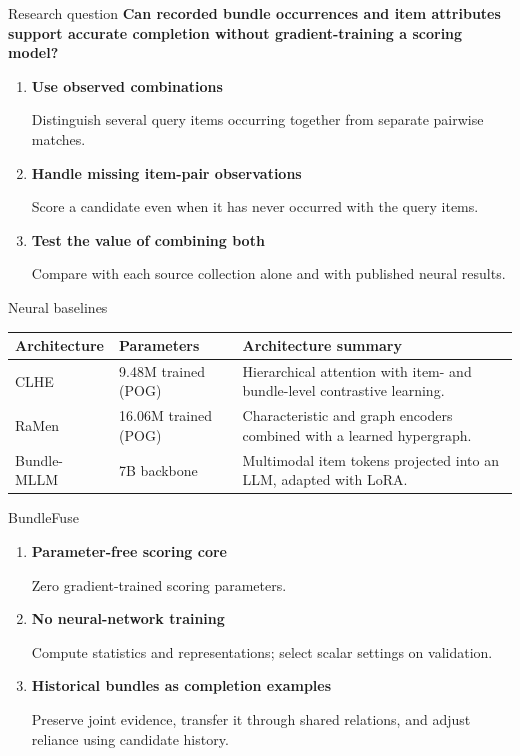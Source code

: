 \documentclass[11pt,aspectratio=169]{beamer}
\newcommand{\key}[1]{\textcolor{Accent}{\textbf{#1}}}
\begin{document}
\begin{frame}{Research question}
\key{Can recorded bundle occurrences and item attributes support accurate
completion without gradient-training a scoring model?}
\vspace{6mm}
\begin{enumerate}\setlength\itemsep{8pt}
\item \textbf{Use observed combinations}\par
Distinguish several query items occurring together from separate pairwise matches.
\item \textbf{Handle missing item-pair observations}\par
Score a candidate even when it has never occurred with the query items.
\item \textbf{Test the value of combining both}\par
Compare with each source collection alone and with published neural results.
\end{enumerate}
\end{frame}

\begin{frame}{Neural baselines}
\renewcommand{\arraystretch}{1.65}
\setlength{\tabcolsep}{5pt}
\begin{tabular}{@{}>{\raggedright\arraybackslash}p{}>{\raggedright\arraybackslash}p{}>{\raggedright\arraybackslash}p{}@{}}
\toprule
\textbf{Architecture} & \textbf{Parameters} & \textbf{Architecture summary}\\
\midrule
CLHE & 9.48M trained (POG) & Hierarchical attention with item- and bundle-level contrastive learning.\\
RaMen & 16.06M trained (POG) & Characteristic and graph encoders combined with a learned hypergraph.\\
Bundle-MLLM & 7B backbone & Multimodal item tokens projected into an LLM, adapted with LoRA.\\
\bottomrule
\end{tabular}
\end{frame}

\begin{frame}{BundleFuse}
\begin{enumerate}\setlength\itemsep{13pt}
\item \key{Parameter-free scoring core}\par
Zero gradient-trained scoring parameters.
\item \key{No neural-network training}\par
Compute statistics and representations; select scalar settings on validation.
\item \key{Historical bundles as completion examples}\par
Preserve joint evidence, transfer it through shared relations, and
adjust reliance using candidate history.
\end{enumerate}
\end{frame}
\end{document}
